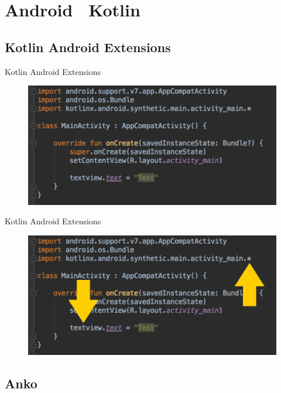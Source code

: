 \section{Android \heart\ Kotlin}
\subsection{Kotlin Android Extensions}

\begin{frame}{Kotlin Android Extensions}{}
    \begin{figure}[h]
    \centering
    \includegraphics[width=\textwidth]{images/kotlin_android/kotlin_android_extensions_1}
    \end{figure}
\end{frame}

\begin{frame}{Kotlin Android Extensions}{}
    \begin{figure}[h]
    \centering
    \includegraphics[width=\textwidth]{images/kotlin_android/kotlin_android_extensions_2}
    \end{figure}
\end{frame}

\subsection{Anko}

